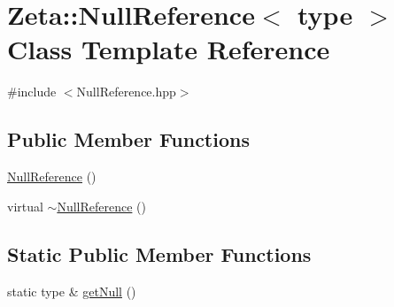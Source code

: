 \hypertarget{classZeta_1_1NullReference}{\section{Zeta\+:\+:Null\+Reference$<$ type $>$ Class Template Reference}
\label{classZeta_1_1NullReference}
}


{\ttfamily \#include $<$Null\+Reference.\+hpp$>$}

\subsection*{Public Member Functions}
\begin{DoxyCompactItemize}
\item 
\hyperlink{classZeta_1_1NullReference_a4f11695356973e84183be274341ec839}{Null\+Reference} ()
\item 
virtual \hyperlink{classZeta_1_1NullReference_ad9207034e2552223d15c94c1c6cf8a4c}{$\sim$\+Null\+Reference} ()
\end{DoxyCompactItemize}
\subsection*{Static Public Member Functions}
\begin{DoxyCompactItemize}
\item 
static type \& \hyperlink{classZeta_1_1NullReference_a770ed5c85c6b2682ca76fe2df45ed360}{get\+Null} ()
\end{DoxyCompactItemize}


